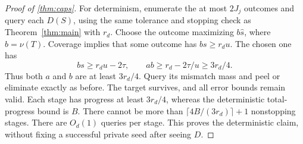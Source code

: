\begin{proof}[Proof of \cref{thm:caps}]
For determinism, enumerate the at most $2J_j$ outcomes and query each $D(S)$, using the same tolerance and stopping check as Theorem~\ref{thm:main} with $r_d$. Choose the outcome maximizing $b\widehat s$, where $b=\nu(T)$. Coverage implies that some outcome has $bs\ge r_du$. The chosen one has
\[
 bs\ge r_du-2\tau,\qquad ab\ge r_d-2\tau/u\ge3r_d/4.
\]
Thus both $a$ and $b$ are at least $3r_d/4$. Query its mismatch mass and peel or eliminate exactly as before. The target survives, and all error bounds remain valid. Each stage has progress at least $3r_d/4$, whereas the deterministic total-progress bound is $B$. There cannot be more than $\lceil4B/(3r_d)\rceil+1$ nonstopping stages. There are $O_d(1)$ queries per stage. This proves the deterministic claim, without fixing a successful private seed after seeing $D$.
\end{proof}
